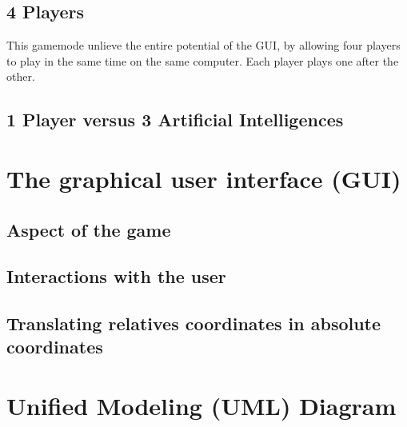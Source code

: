 \documentclass[english, 11pt, titlepage]{article}
\begin{document}
    \subsection{4 Players}
    This gamemode unlieve the entire potential of the GUI, by allowing four players to play in the same time on the same computer. Each player plays one after the other.

    \subsection{1 Player versus 3 Artificial Intelligences}

    \section{The graphical user interface (GUI)}
    \subsection{Aspect of the game}
    \subsection{Interactions with the user}
    \subsection{Translating relatives coordinates in absolute coordinates}
    \label{section:translating_coordinates}

    \pagebreak
    \appendix
    \appendixpage
    \addappheadtotoc
    \section{Unified Modeling (UML) Diagram}
    
\end{document}
